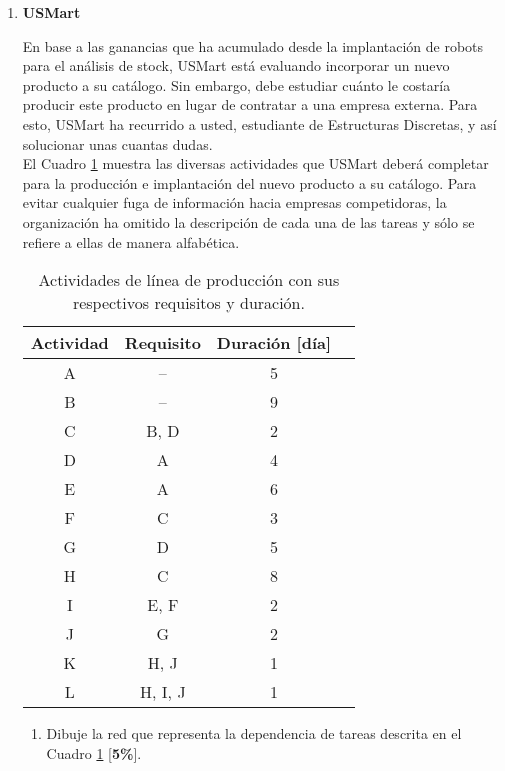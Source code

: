 \documentclass[legalpaper,10pt]{article}
\begin{document}
\begin{enumerate}
\item \textbf{USMart}\\
\begin{minipage}[b]{0.44\textwidth}
En base a las ganancias que ha acumulado desde la implantación de robots para el análisis de stock, USMart está evaluando incorporar un nuevo producto a su catálogo. Sin embargo, debe estudiar cuánto le costaría producir este producto en lugar de contratar a una empresa externa. Para esto, USMart ha recurrido a usted, estudiante de Estructuras Discretas, y así solucionar unas cuantas dudas.\\
El Cuadro \ref{usmart} muestra las diversas actividades que USMart deberá completar para la producción e implantación del nuevo producto a su catálogo. Para evitar cualquier fuga de información hacia empresas competidoras, la organización ha omitido la descripción de cada una de las tareas y sólo se refiere a ellas de manera alfabética.
\end{minipage}
\hfill
\begin{minipage}[b]{0.46\textwidth}
\begin{table}[H]
\centering
\begin{tabular}{|c|c|c|c|}
\hline
\textbf{Actividad} & \textbf{Requisito} & \textbf{Duración [día]}   \\ \hline
A  & --      &  5    \\ \hline
B  & --      &  9    \\ \hline
C  & B, D    &  2    \\ \hline
D  & A       &  4    \\ \hline
E  & A       &  6    \\ \hline
F  & C       &  3    \\ \hline
G  & D       &  5    \\ \hline
H  & C       &  8    \\ \hline
I  & E, F    &  2    \\ \hline
J  & G       &  2    \\ \hline
K  & H, J    &  1    \\ \hline
L  & H, I, J &  1    \\ \hline
\end{tabular}
\caption{Actividades de línea de producción con sus respectivos requisitos y duración.}
\label{usmart}
\end{table}
\end{minipage}


\begin{enumerate}
  \item Dibuje la red que representa la dependencia de tareas descrita en el Cuadro \ref{usmart} [\textbf{5\%}].


\end{enumerate}
\end{enumerate}
\end{document}

